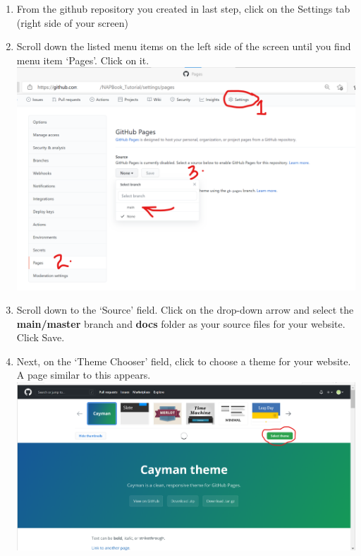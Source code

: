 \documentclass[
]{book}
\providecommand{\tightlist}{%
  \setlength{\itemsep}{0pt}\setlength{\parskip}{0pt}}
\begin{document}
\begin{enumerate}
\def\labelenumi{\arabic{enumi}.}
\tightlist
\item
  From the github repository you created in last step, click on the Settings tab (right side of your screen)\\
\item
  Scroll down the listed menu items on the left side of the screen until you find menu item `Pages'. Click on it.\\
  \includegraphics{tutorial_screenshots/gh_pages_setup.png}
\item
  Scroll down to the `Source' field. Click on the drop-down arrow and select the \textbf{main/master} branch and \textbf{docs} folder as your source files for your website. Click Save.\\
\item
  Next, on the `Theme Chooser' field, click to choose a theme for your website.\\
  A page similar to this appears. \includegraphics{tutorial_screenshots/gh_pages_theme.png}
\end{enumerate}
\end{document}
